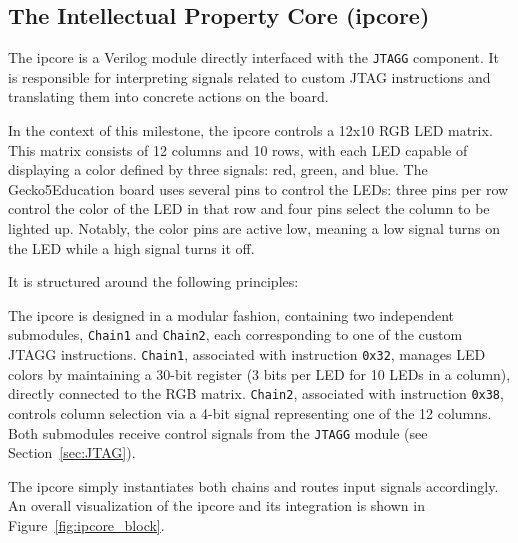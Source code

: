 \documentclass[a4paper,11pt,oneside]{report}
\newcommand{\boardName}{Gecko5Education \xspace}
\begin{document}
\subsection{The Intellectual Property Core (ipcore)}

The ipcore is a Verilog module directly interfaced with the \texttt{JTAGG} component. 
It is responsible for interpreting signals related to custom JTAG instructions and translating them into concrete actions on the board.

In the context of this milestone, the ipcore controls a 12x10 RGB LED matrix.
This matrix consists of 12 columns and 10 rows, with each LED capable of displaying a color defined by three signals: red, green, and blue. The \boardName board uses several pins
 to control the LEDs: three pins per row control the color of the LED in that row and four pins select the column to be lighted up.  
Notably, the color pins are active low, meaning a low signal turns on the LED while a high signal turns it off.

It is structured around the following principles:

The ipcore is designed in a  modular fashion, containing two independent submodules, \texttt{Chain1} and \texttt{Chain2}, each corresponding to one of the custom JTAGG instructions.  
\texttt{Chain1}, associated with instruction \texttt{0x32}, manages LED colors by maintaining a 30-bit register (3 bits per LED for 10 LEDs in a column), directly connected to the RGB matrix.  
\texttt{Chain2}, associated with instruction \texttt{0x38}, controls column selection via a 4-bit signal representing one of the 12 columns.  
Both submodules receive control signals from the \texttt{JTAGG} module (see Section~\ref{sec:JTAG}).  

The ipcore simply instantiates both chains and routes input signals accordingly. An overall visualization of the ipcore and its integration is shown in Figure~\ref{fig:ipcore_block}.
\end{document}
